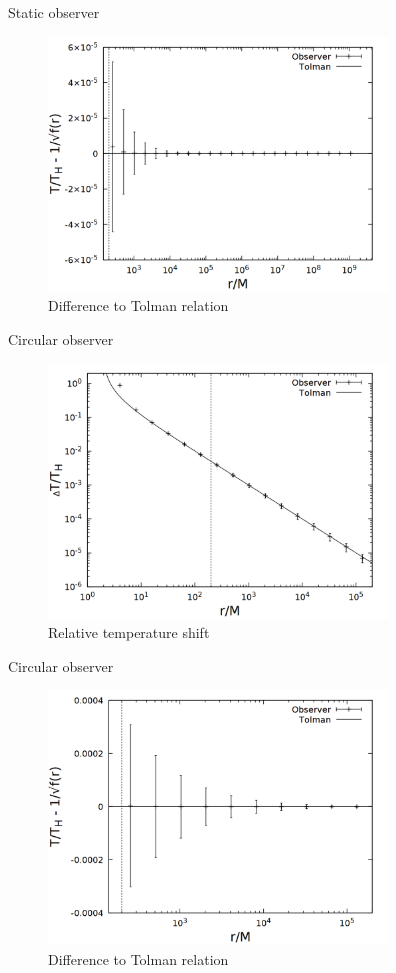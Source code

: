 \documentclass{beamer}
\begin{document}
\begin{frame}{Static observer}
\begin{figure}
	\centering
    \includegraphics[width=9cm]{../cpp/final/stat_tolman.png}
    \caption{Difference to Tolman relation}
\end{figure}
\end{frame}

\begin{frame}{Circular observer}
\begin{figure}
	\centering
    \includegraphics[width=9cm]{../cpp/final/circ.png}
    \caption{Relative temperature shift}
\end{figure}
\end{frame}

\begin{frame}{Circular observer}
\begin{figure}
	\centering
    \includegraphics[width=9cm]{../cpp/final/circ_tolman.png}
    \caption{Difference to Tolman relation}
\end{figure}
\end{frame}
\end{document}
